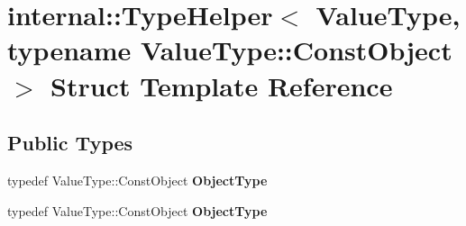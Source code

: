 \hypertarget{structinternal_1_1_type_helper_3_01_value_type_00_01typename_01_value_type_1_1_const_object_01_4}{}\section{internal\+:\+:Type\+Helper$<$ Value\+Type, typename Value\+Type\+:\+:Const\+Object $>$ Struct Template Reference}
\label{structinternal_1_1_type_helper_3_01_value_type_00_01typename_01_value_type_1_1_const_object_01_4}
\subsection*{Public Types}
\begin{DoxyCompactItemize}
\item 
typedef Value\+Type\+::\+Const\+Object {\bfseries Object\+Type}\hypertarget{structinternal_1_1_type_helper_3_01_value_type_00_01typename_01_value_type_1_1_const_object_01_4_a986df6ac09ceb6cc9ba9fd4d73e90495}{}\label{structinternal_1_1_type_helper_3_01_value_type_00_01typename_01_value_type_1_1_const_object_01_4_a986df6ac09ceb6cc9ba9fd4d73e90495}

\item 
typedef Value\+Type\+::\+Const\+Object {\bfseries Object\+Type}\hypertarget{structinternal_1_1_type_helper_3_01_value_type_00_01typename_01_value_type_1_1_const_object_01_4_a986df6ac09ceb6cc9ba9fd4d73e90495}{}\label{structinternal_1_1_type_helper_3_01_value_type_00_01typename_01_value_type_1_1_const_object_01_4_a986df6ac09ceb6cc9ba9fd4d73e90495}

\end{DoxyCompactItemize}
